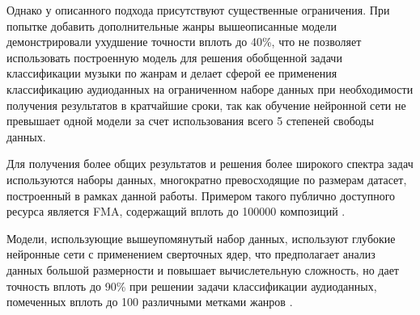 Однако у описанного подхода присутствуют существенные ограничения. При попытке добавить дополнительные жанры вышеописанные модели демонстрировали ухудшение точности вплоть до 40\%, что
не позволяет использовать построенную модель для решения обобщенной задачи классификации музыки по жанрам и делает сферой ее применения
классификацию аудиоданных на ограниченном наборе данных при необходимости получения результатов в кратчайшие сроки, так как обучение нейронной сети не превышает одной модели за счет использования всего 5 степеней свободы данных.

Для получения более общих результатов и решения более широкого спектра задач используются наборы данных, многократно превосходящие
по размерам датасет, построенный в рамках данной работы. Примером такого публично доступного ресурса является FMA, содержащий вплоть до 100000 композиций \cite{fma}.

Модели, использующие вышеупомянутый набор данных, используют глубокие нейронные сети с применением сверточных ядер, что предполагает анализ данных большой размерности и повышает вычислетельную сложность, но дает
точность вплоть до 90\% при решении задачи классификации аудиоданных, помеченных вплоть до 100 различными метками жанров \cite{zero} \cite{kim}.


